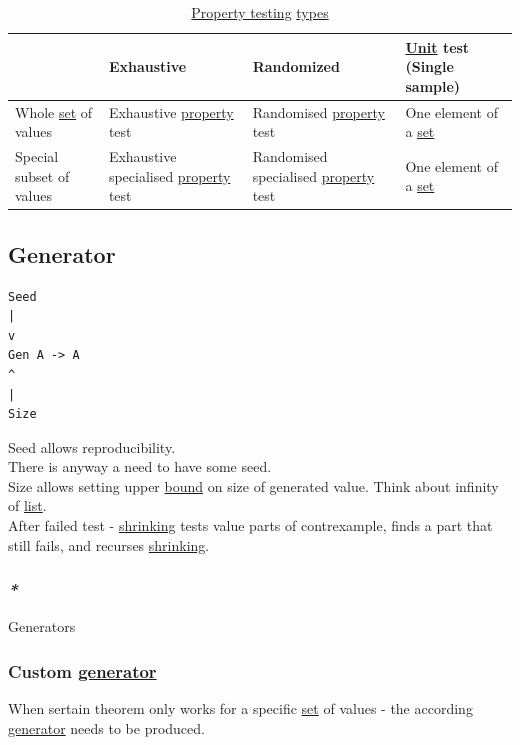 \documentclass[a4paper,14pt,oneside]{book}
\begin{document}
\begin{table}[htbp]
\caption{\label{tab--property-testing-type}\hyperref[org9567741]{Property testing} \hyperref[orgcd0efa8]{types}}
\centering
\begin{tabular}{llll}
\hline
 & Exhaustive & Randomized & \hyperref[org7580d7d]{Unit} test (Single sample)\\
\hline
Whole \hyperref[org297bd45]{set} of values & Exhaustive \hyperref[orgd3f5c46]{property} test & Randomised \hyperref[orgd3f5c46]{property} test & One element of a \hyperref[org297bd45]{set}\\
Special subset of values & Exhaustive specialised \hyperref[orgd3f5c46]{property} test & Randomised specialised \hyperref[orgd3f5c46]{property} test & One element of a \hyperref[org297bd45]{set}\\
\hline
\end{tabular}
\end{table}

\subsection{\label{orgae5c7bf}Generator}
\label{sec:org4751b14}
\begin{verbatim}
Seed
|
v
Gen A -> A
^
|
Size
\end{verbatim}

Seed allows reproducibility.\\
There is anyway a need to have some seed.\\
Size allows setting upper \hyperref[org7938c1d]{bound} on size of generated value. Think about infinity of \hyperref[orgd49464d]{list}.\\

After failed test - \hyperref[org9dc09b3]{shrinking} tests value parts of contrexample, finds a part that still fails, and recurses \hyperref[org9dc09b3]{shrinking}.\\

\subsubsection{\emph{*}}
\label{sec:org532e67c}

\label{org37d81a7}Generators\\

\subsubsection{Custom \hyperref[orgae5c7bf]{generator}}
\label{sec:orgcb8e8fb}
When sertain theorem only works for a specific \hyperref[org297bd45]{set} of values - the according \hyperref[orgae5c7bf]{generator} needs to be produced.\\
\end{document}

